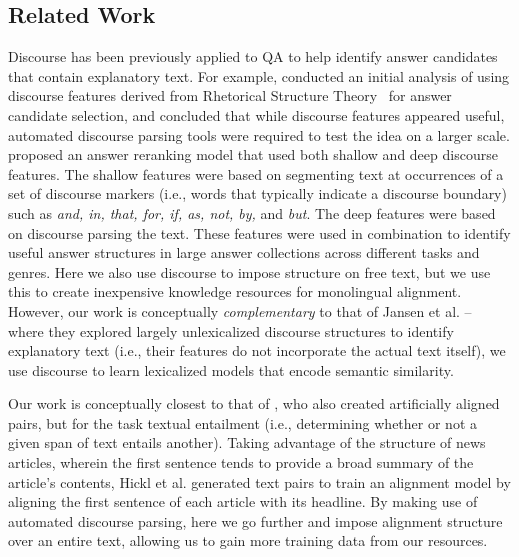 \subsection{Related Work}
Discourse has been previously applied to QA to help identify answer candidates that contain explanatory text.  For example, \citet{Verberne:2007} conducted an initial analysis of using discourse features derived from Rhetorical Structure Theory~\citep[RST,][]{mann88} for answer candidate selection, and concluded that while discourse features appeared useful, automated discourse parsing tools were required to test the idea on a larger scale.  
\citet{jansen14} proposed an answer reranking model that used both shallow and deep discourse features.  The shallow features were based on segmenting text at occurrences of a set of discourse markers \citep{marcu97} (i.e., words that typically indicate a discourse boundary) such as \textit{and, in, that, for, if, as, not, by,} and \textit{but}.  The deep features were based on discourse parsing the text.  These features were used in combination to identify useful answer structures in large answer collections across different tasks and genres.  Here we also use discourse to impose structure on free text, but we use this to create inexpensive knowledge resources for monolingual alignment. However, our work is conceptually \textit{complementary} to that of Jansen et al. -- where they explored largely unlexicalized discourse structures to identify explanatory text (i.e., their features do not incorporate the actual text itself), we use discourse to learn lexicalized models that encode semantic similarity.

Our work is conceptually closest to that of \citet{hickl2006recognizing}, who also created artificially aligned pairs, but for the task textual entailment (i.e., determining whether or not a given span of text entails another).  Taking advantage of the structure of news articles, wherein the first sentence tends to provide a broad summary of the article's contents, Hickl et al. generated text pairs to train an alignment model by aligning the first sentence of each article with its headline.  By making use of automated discourse parsing, here we go further and impose alignment structure over an entire text, allowing us to gain more training data from our resources.

